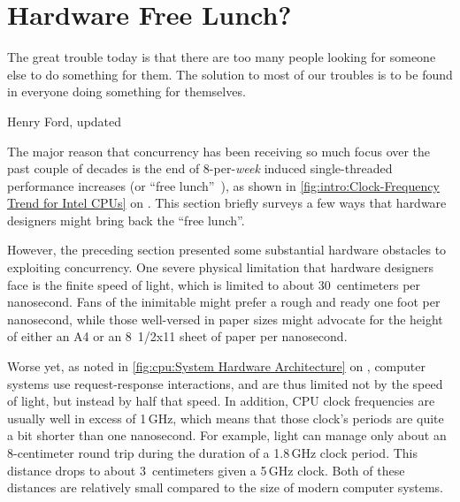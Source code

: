 
\section{Hardware Free Lunch?}
\label{sec:cpu:Hardware Free Lunch?}
%
\epigraph{The great trouble today is that there are too many people looking
	  for someone else to do something for them.
	  The solution to most of our troubles is to be found in everyone
	  doing something for themselves.}
	 {Henry Ford, updated}

The major reason that concurrency has been receiving so much focus
over the past couple of decades is the end of 8\pct-per-\emph{week}
 induced single-threaded performance
increases (or ``free lunch''~\cite{HerbSutter2008EffectiveConcurrency}),
as shown in
\cref{fig:intro:Clock-Frequency Trend for Intel CPUs} on
.
This section briefly surveys a few ways that hardware designers
might bring back the ``free lunch''.

However, the preceding section presented some substantial hardware
obstacles to exploiting concurrency.
One severe physical limitation that hardware designers face is the finite
speed of light, which is limited to about 30~centimeters per nanosecond.
Fans of the inimitable  might prefer a rough and
ready one foot per nanosecond, while those well-versed in paper sizes
might advocate for the height of either an A4 or an 8~1/2x11 sheet of
paper per nanosecond.

Worse yet, as noted in
\cref{fig:cpu:System Hardware Architecture} on
,
computer systems use request-response interactions, and are thus
limited not by the speed of light, but instead by half that speed.
In addition, CPU clock frequencies are usually well in excess of 1\,GHz,
which means that those clock's periods are quite a bit shorter than
one nanosecond.
For example, light can manage only about an 8-centimeter round trip
during the duration of a 1.8\,GHz clock period.
This distance drops to about 3~centimeters given a 5\,GHz clock.
Both of these distances are relatively small compared to the size
of modern computer systems.

